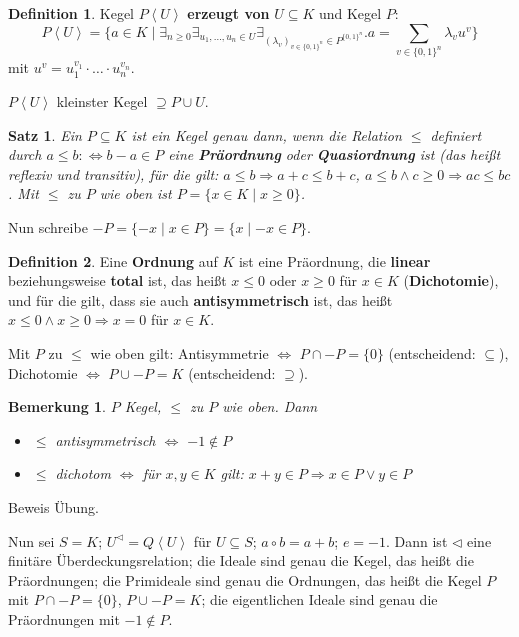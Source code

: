 \documentclass[headsepline=true,DIV=11]{scrartcl}
\newtheorem*{theorem}{Satz}
\newtheorem*{remark}{Bemerkung}
\theoremstyle{definition}
\newtheorem*{definition}{Definition}
\begin{document}
\begin{definition}
  Kegel $P\left< U\right>$ {\bf erzeugt von} $U\subseteq K$ und Kegel $P$:
  $$ P\left< U\right>=\{a\in K\mid \exists_{n\ge 0}\exists_{u_1,\ldots,u_n\in U}\exists_{(\lambda_v)_{v\in\{0,1\}^n}\in
    P^{\{0,1\}^n}}. a=\sum\limits_{v\in\{0,1\}^n}\lambda_v u^v\} $$
  mit $u^v = u_1^{v_1}\cdot\ldots\cdot u_n^{v_n}$.

  $P\left< U\right>$ kleinster Kegel $\supseteq P\cup U$.
\end{definition}

\begin{theorem}
  Ein $P\subseteq K$ ist ein Kegel genau dann, wenn die Relation $\le$ definiert durch $a\le b :\Leftrightarrow b-a\in P$ eine {\bf Präordnung} oder
  {\bf Quasiordnung} ist (das heißt reflexiv und transitiv), für die gilt: $a\le b\Rightarrow a+c\le b+c$, $a\le b \land c\ge 0\Rightarrow ac\le
  bc$. Mit $\le$ zu $P$ wie oben ist $P=\{x\in K\mid x\ge 0\}$.
\end{theorem}

Nun schreibe $-P = \{-x\mid x\in P\}=\{x\mid -x\in P\}$.

\begin{definition}
  Eine {\bf Ordnung} auf $K$ ist eine Präordnung, die {\bf linear} beziehungsweise {\bf total} ist, das heißt $x\le 0$ oder $x\ge 0$ für $x\in K$
  ({\bf Dichotomie}), und für die gilt, dass sie auch {\bf antisymmetrisch} ist, das heißt $x\le 0 \land x\ge 0\Rightarrow x=0$ für $x\in K$.
\end{definition}

Mit $P$ zu $\le$ wie oben gilt: Antisymmetrie $\Leftrightarrow$ $P\cap -P=\{0\}$ (entscheidend: $\subseteq$), Dichotomie $\Leftrightarrow$ $P\cup -P =
K$ (entscheidend: $\supseteq$).

\begin{remark}
  $P$ Kegel, $\le$ zu $P$ wie oben. Dann
  \begin{itemize}
  \item $\le$ antisymmetrisch $\Leftrightarrow$ $-1\not\in P$
  \item $\le$ dichotom $\Leftrightarrow$ für $x,y\in K$ gilt: $x+y\in P\Rightarrow x\in P \vee y\in P$
  \end{itemize}
\end{remark}

Beweis Übung.

Nun sei $S=K$; $U^\lhd=Q\left<U\right>$ für $U\subseteq S$; $a\circ b = a+b$; $e=-1$. Dann ist $\lhd$ eine finitäre Überdeckungsrelation; die Ideale
sind genau die Kegel, das heißt die Präordnungen; die Primideale sind genau die Ordnungen, das heißt die Kegel $P$ mit $P\cap -P=\{0\}$, $P\cup -P=K$;
die eigentlichen Ideale sind genau die Präordnungen mit $-1\not\in P$.
\end{document}
